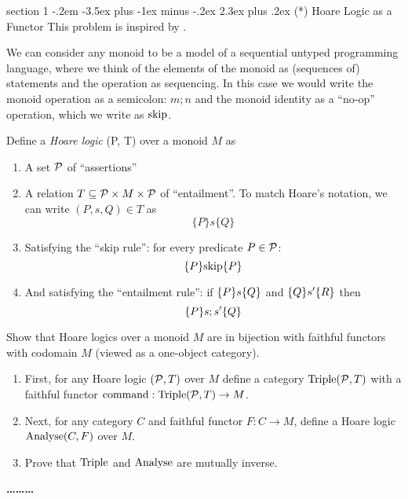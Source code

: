 \documentclass[12pt]{article}
\makeatletter
\newenvironment{problem}{\@startsection
       {section}
       {1}
       {-.2em}
       {-3.5ex plus -1ex minus -.2ex}
       {2.3ex plus .2ex}
       {\pagebreak[3]%
       \large\bf\noindent{Problem }
       }
       }
       {%
       \begin{center}\large\bf \ldots\ldots\ldots\end{center}}
\makeatother
\begin{document}
\begin{problem}{(*) Hoare Logic as a Functor}
  This problem is inspired by \citet{mz2015functors}.
  
  We can consider any monoid to be a model of a sequential untyped
  programming language, where we think of the elements of the monoid
  as (sequences of) statements and the operation as sequencing. In
  this case we would write the monoid operation as a semicolon: $m; n$
  and the monoid identity as a ``no-op'' operation, which we write as
  $\textrm{skip}$.

  Define a \emph{Hoare logic} \citep{hoare69} (P, T) over a monoid $M$ as
  \begin{enumerate}
  \item A set $\mathcal{P}$ of ``assertions''
  \item A relation $T \subseteq \mathcal{P} \times M \times \mathcal{P}$
    of ``entailment''. To match Hoare's notation, we can write
    $(P,s,Q) \in T$ as
    \[\{P\} s \{Q\}\]

  \item Satisfying the ``skip rule'': for every predicate $P \in
    \mathcal{P}$:
    \[ \{P\}{\textrm{skip}}\{P\} \]

  \item And satisfying the ``entailment rule'': if $\{P\}{s}\{Q\}$
    and $\{Q\}{s'}\{R\}$ then
    \[ \{P\}{s;s'}\{Q\} \]
  \end{enumerate}

  Show that Hoare logics over a monoid $M$ are in bijection with
  faithful functors with codomain $M$ (viewed as a one-object
  category).
  \begin{enumerate}
  \item First, for any Hoare logic $(\mathcal{P}, T)$ over $M$ define a category
    $\textrm{Triple}(\mathcal{P},T)$ with a faithful functor $\textrm{command} :
    \textrm{Triple}(\mathcal{P}, T) \to M$.
  \item Next, for any category $C$ and faithful functor $F : C \to M$,
    define a Hoare logic $\textrm{Analyse}(C,F)$ over $M$.
  \item Prove that $\textrm{Triple}$ and $\textrm{Analyse}$ are mutually inverse.
  \end{enumerate}
\end{problem}


\end{document}
